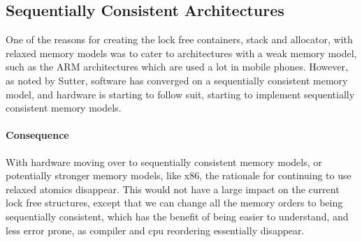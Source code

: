 \subsection{Sequentially Consistent Architectures}
\label{subsec:longevity_sequentially_consistent_architectures}
One of the reasons for creating the lock free containers, stack and allocator,
with relaxed memory models was to cater to architectures with a weak memory model,
such as the ARM architectures which are used a lot in mobile phones.
However, as noted by Sutter\cite[55:15]{herb_sutter_atomic_weapons},
software has converged on a sequentially consistent memory model,
and hardware is starting to follow suit, starting to implement sequentially
consistent memory models.

\paragraph{Consequence}
With hardware moving over to sequentially consistent memory models,
or potentially stronger memory models, like x86\cite{preshing_weak_vs_strong_memory_models},
the rationale for continuing to use relaxed atomics disappear.
This would not have a large impact on the current lock free
structures, except that we can change all the memory orders
to being sequentially consistent, which has the benefit of being
easier to understand, and less error prone, as compiler and cpu reordering
essentially disappear.
